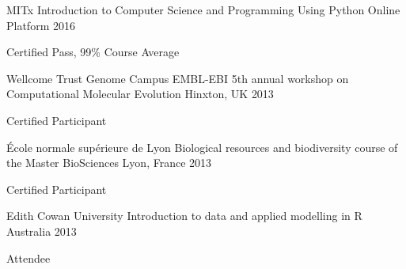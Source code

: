 

\begin{cventries}

  \cventry
    {MITx} %
    {Introduction to Computer Science and Programming Using Python} %
    {Online Platform} %
    {2016} %
    {
      \begin{cvitems} %
        \item {Certified Pass, 99\% Course Average}
      \end{cvitems}
    }

  \cventry
    {Wellcome Trust Genome Campus EMBL-EBI} %
    {5th annual workshop on Computational Molecular Evolution} %
    {Hinxton, UK} %
    {2013} %
    {
      \begin{cvitems} %
        \item {Certified Participant}
      \end{cvitems}
    }

  \cventry
    {École normale supérieure de Lyon} %
    {Biological resources and biodiversity course of the Master BioSciences} %
    {Lyon, France} %
    {2013} %
    {
      \begin{cvitems} %
        \item {Certified Participant}
      \end{cvitems}
    }

  \cventry
    {Edith Cowan University} %
    {Introduction to data and applied modelling in R} %
    {Australia} %
    {2013} %
    {
      \begin{cvitems} %
        \item {Attendee}
      \end{cvitems}
    }

\end{cventries}
